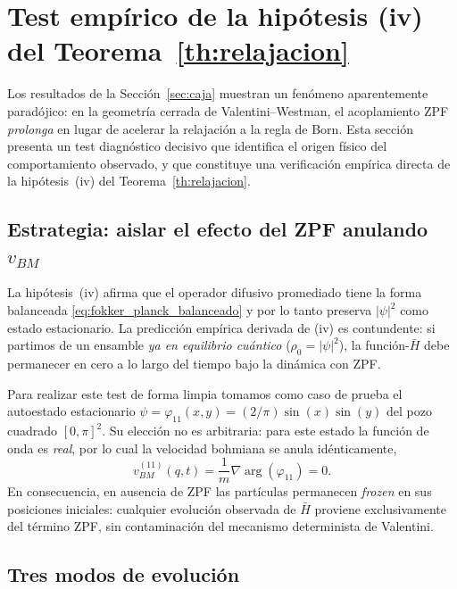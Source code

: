 \documentclass[11pt,a4paper]{article}
\begin{document}
\section{Test empírico de la hipótesis (iv) del Teorema~\ref{th:relajacion}}
\label{sec:test_hipotesis_iv}

Los resultados de la Sección~\ref{sec:caja} muestran un fenómeno
aparentemente paradójico: en la geometría cerrada de Valentini--Westman,
el acoplamiento ZPF \emph{prolonga} en lugar de acelerar la relajación
a la regla de Born. Esta sección presenta un test diagnóstico decisivo
que identifica el origen físico del comportamiento observado, y que
constituye una verificación empírica directa de la hipótesis~(iv) del
Teorema~\ref{th:relajacion}.

\subsection{Estrategia: aislar el efecto del ZPF anulando $v_{BM}$}
\label{sec:estrategia_test}

La hipótesis~(iv) afirma que el operador difusivo promediado tiene la
forma balanceada \eqref{eq:fokker_planck_balanceado} y por lo tanto
preserva $|\psi|^2$ como estado estacionario. La predicción empírica
derivada de (iv) es contundente: si partimos de un ensamble \emph{ya en
equilibrio cuántico} ($\rho_0=|\psi|^2$), la función-$\bar{H}$ debe
permanecer en cero a lo largo del tiempo bajo la dinámica con ZPF.

Para realizar este test de forma limpia tomamos como caso de prueba el
autoestado estacionario $\psi=\varphi_{11}(x,y)=(2/\pi)\sin(x)\sin(y)$
del pozo cuadrado $[0,\pi]^2$. Su elección no es arbitraria: para este
estado la función de onda es \emph{real}, por lo cual la velocidad
bohmiana se anula idénticamente,
\begin{equation}
v_{BM}^{(11)}(q,t) = \frac{1}{m}\nabla\arg(\varphi_{11}) = 0.
\label{eq:vBM_phi11}
\end{equation}
En consecuencia, en ausencia de ZPF las partículas permanecen
\emph{frozen} en sus posiciones iniciales: cualquier evolución
observada de $\bar{H}$ proviene exclusivamente del término ZPF, sin
contaminación del mecanismo determinista de Valentini.

\subsection{Tres modos de evolución}
\label{sec:tres_modos}
\end{document}
